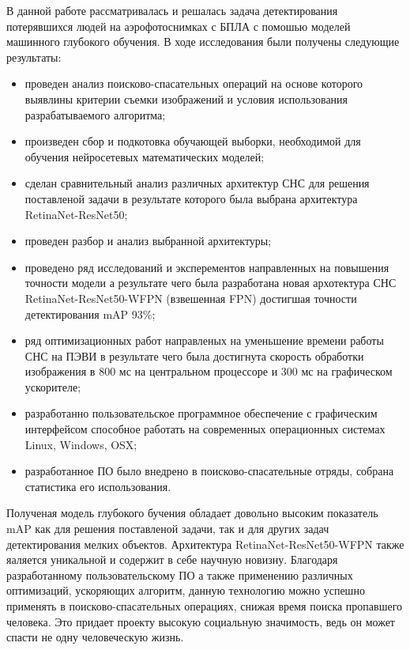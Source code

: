 
В данной работе рассматривалась и решалась задача детектирования потерявшихся людей на аэрофотоснимках с БПЛА с помошью моделей машинного глубокого обучения. В ходе исследования были получены следующие результаты:
\begin{itemize}
    \item проведен анализ поисково-спасательных операций на основе которого выявлины критерии съемки изображений и условия использования разрабатываемого алгоритма;
    \item произведен сбор и подкотовка обучающей выборки, необходимой для обучения нейросетевых математических моделей;
    \item сделан сравнительный анализ различных архитектур СНС для решения поставленой задачи в результате которого была выбрана архитектура RetinaNet-ResNet50;
    \item проведен разбор и анализ выбранной архитектуры;
    \item проведено ряд исследований и эксперементов направленных на повышения точности модели а результате чего была разработана новая архотектура СНС RetinaNet-ResNet50-WFPN (взвешенная FPN) достигшая точности детектирования mAP 93\%;
    \item ряд оптимизационных работ направленых на уменьшение времени работы СНС на ПЭВИ в результате чего была достигнута скорость обработки изображения в 800 мс на центральном процессоре и 300 мс на графическом ускорителе;
    \item разработанно пользовательское программное обеспечение с графическим интерфейсом способное работать на современных операционных системах Linux, Windows, OSX;
    \item разработанное ПО было внедрено в поисково-спасательные отряды, собрана статистика его использования. 
\end{itemize}

Полученая модель глубокого бучения обладает довольно высоким показатель mAP как для решения поставленой задачи, так и для других задач детектирования мелких объектов. Архитектура RetinaNet-ResNet50-WFPN также яаляется уникальной и содержит в себе научную новизну. Благодаря разработанному пользовательскому ПО а также применению различных оптимизаций, ускоряющих алгоритм, данную технологию можно успешно применять в поисково-спасательных операциях, снижая время поиска пропавшего человека. Это придает проекту высокую социальную значимость, ведь он может спасти не одну человеческую жизнь.

\clearpage